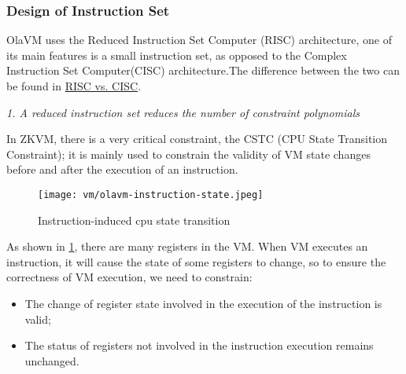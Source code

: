 \subsubsection{Design of Instruction Set} \label{sec:design-instruction-set}

OlaVM uses the Reduced Instruction Set Computer (RISC) architecture, one of its main features is a small instruction set, as opposed
to the Complex Instruction Set Computer(CISC) architecture.The difference between the two can be found in
\href{https://cs.stanford.edu/people/eroberts/courses/soco/projects/risc/risccisc/}{RISC vs. CISC}.

\emph{1. A reduced instruction set reduces the number of constraint polynomials}

In ZKVM, there is a very critical constraint, the CSTC (CPU State Transition Constraint); it is mainly used to constrain the validity
of VM state changes before and after the execution of an instruction.

\begin{figure}[!ht]
    \centering
    \texttt{[image: vm/olavm-instruction-state.jpeg]}
    \caption{Instruction-induced cpu state transition}
    \label{fig:instruction-cpu-state-transition}
\end{figure}

As shown in \ref{fig:instruction-cpu-state-transition}, there are many registers in the VM. When VM executes an instruction, it will
cause the state of some registers to change, so to ensure the correctness of VM execution, we need to constrain:
\begin{itemize}
    \item The change of register state involved in the execution of the instruction is valid;
    \item The status of registers not involved in the instruction execution remains unchanged.
\end{itemize}

